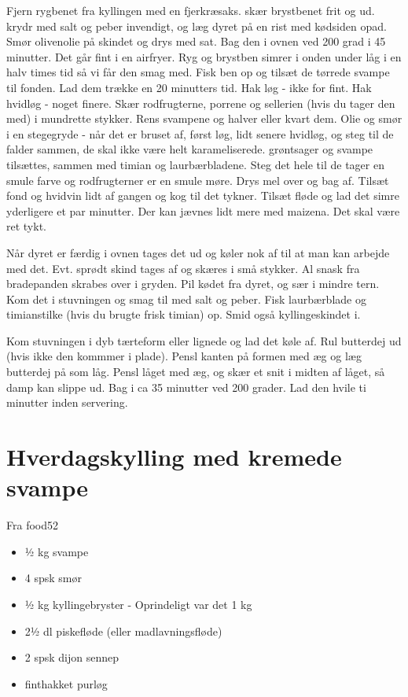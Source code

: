 \documentclass[
]{book}
\providecommand{\tightlist}{%
  \setlength{\itemsep}{0pt}\setlength{\parskip}{0pt}}
\begin{document}
Fjern rygbenet fra kyllingen med en fjerkræsaks. skær brystbenet frit og ud.
krydr med salt og peber invendigt, og læg dyret på en rist med kødsiden opad.
Smør olivenolie på skindet og drys med sat. Bag den i ovnen ved 200 grad i
45 minutter. Det går fint i en airfryer.
Ryg og brystben simrer i onden under låg i en halv times tid så vi får den
smag med. Fisk ben op og tilsæt de tørrede svampe til fonden. Lad dem trække
en 20 minutters tid.
Hak løg - ikke for fint. Hak hvidløg - noget finere. Skær rodfrugterne, porrene
og sellerien (hvis du tager den med) i mundrette stykker. Rens svampene og
halver eller kvart dem.
Olie og smør i en stegegryde - når det er bruset af, først løg, lidt senere
hvidløg, og steg til de falder sammen, de skal ikke være helt karameliserede.
grøntsager og svampe tilsættes, sammen med timian og laurbærbladene. Steg det hele
til de tager en smule farve og rodfrugterner er en smule møre. Drys mel over
og bag af. Tilsæt fond og hvidvin lidt af gangen og kog til det tykner.
Tilsæt fløde og lad det simre yderligere et par minutter. Der kan jævnes lidt
mere med maizena. Det skal være ret tykt.

Når dyret er færdig i ovnen tages det ud og køler nok af til at man kan arbejde
med det. Evt. sprødt skind tages af og skæres i små stykker.
Al snask fra bradepanden skrabes over i gryden.
Pil kødet fra dyret, og sær i mindre tern. Kom det i stuvningen og smag til med
salt og peber. Fisk laurbærblade og timianstilke (hvis du brugte frisk timian)
op. Smid også kyllingeskindet i.

Kom stuvningen i dyb tærteform eller lignede og lad det køle af.
Rul butterdej ud (hvis ikke den kommmer i plade). Pensl kanten på formen med æg
og læg butterdej på som låg. Pensl låget med æg, og skær et snit i midten af
låget, så damp kan slippe ud. Bag i ca 35 minutter ved 200 grader. Lad
den hvile ti minutter inden servering.

\section{Hverdagskylling med kremede svampe}\label{hverdagskylling-med-kremede-svampe}

Fra food52

\begin{itemize}
\tightlist
\item
  ½ kg svampe
\item
  4 spsk smør
\item
  ½ kg kyllingebryster - Oprindeligt var det 1 kg
\item
  2½ dl piskefløde (eller madlavningsfløde)
\item
  2 spsk dijon sennep
\item
  finthakket purløg
\end{itemize}
\end{document}
